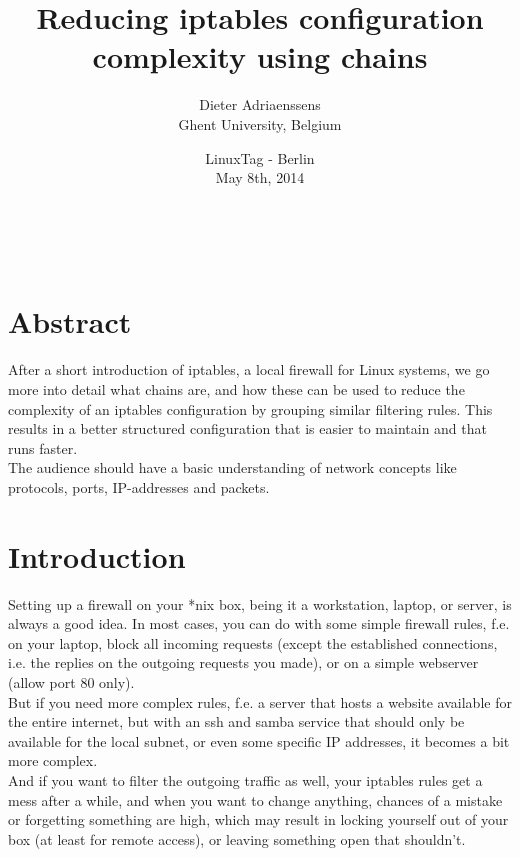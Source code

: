 \documentclass[a4paper,12pt]{article}
\begin{document}
\title{Reducing iptables configuration complexity using chains}
\author{Dieter Adriaenssens\\
Ghent University, Belgium}
\date{LinuxTag - Berlin\\
May 8th, 2014}
\maketitle

\vfill
\begin{center}
  \\[2.5ex]
    {\footnotesize\CcNote{\CcLongnameBySa}}
  \vspace*{-2.5ex}
\end{center}

\pagebreak
\section{Abstract}

After a short introduction of iptables, a local firewall for Linux systems, we go more into detail what chains are, and how these can be used to reduce the complexity of an iptables configuration by grouping similar filtering rules. This results in a better structured configuration that is easier to maintain and that runs faster.\\

The audience should have a basic understanding of network concepts like protocols, ports, IP-addresses and packets.

\tableofcontents
\pagebreak

\section{Introduction}
Setting up a firewall on your *nix box, being it a workstation, laptop, or server, is always a good idea. In most cases, you can do with some simple firewall rules, f.e. on your laptop, block all incoming requests (except the established connections, i.e. the replies on the outgoing requests you made), or on a simple webserver (allow port 80 only).\\

But if you need more complex rules, f.e. a server that hosts a website available for the entire internet, but with an ssh and samba service that should only be available for the local subnet, or even some specific IP addresses, it becomes a bit more complex.\\
And if you want to filter the outgoing traffic as well, your iptables rules get a mess after a while, and when you want to change anything, chances of a mistake or forgetting something are high, which may result in locking yourself out of your box (at least for remote access), or leaving something open that shouldn't.\\
\end{document}
